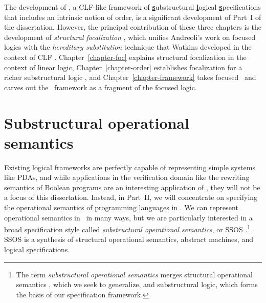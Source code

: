 The development of \sls, a CLF-like framework of \underline{\bf
  s}ubstructural \underline{\bf l}ogical \underline{\bf
  s}pecifications that includes an intrinsic notion of order, is a
significant development of Part~I of the dissertation.  However, the
principal contribution of these three chapters is the development of
{\it structural focalization} \cite{simmons11structural}, which
unifies Andreoli's work on focused logics \cite{andreoli92logic} with
the {\it hereditary substitution} technique that Watkins developed in
the context of CLF
\cite{watkins02concurrent}. Chapter~\ref{chapter-foc} explains
structural focalization in the context of linear logic,
Chapter~\ref{chapter-order} establishes focalization for a richer
substructural logic \ollll, and Chapter~\ref{chapter-framework} takes
focused \ollll~and carves out the \sls~framework as a fragment of the
focused logic.

\section{Substructural operational semantics}
\label{sec:intro-ssos}

Existing logical frameworks are perfectly capable of representing
simple systems like PDAs, and while applications in the verification
domain like the rewriting semantics of Boolean programs are an
interesting application of \sls, they will not be a focus of this
dissertation. Instead, in Part~II, we will concentrate on
specifying the operational semantics of programming languages in \sls.
%
We can represent operational semantics in
\sls~in many ways, but we are particularly interested in a broad
specification style called {\it substructural operational semantics},
or SSOS
\cite{pfenning04substructural,pfenning09substructural}.\footnote{The
  term {\it substructural operational semantics} merges structural
  operational semantics \cite{plotkin04structural}, which we seek to
  generalize, and substructural logic, which forms the basis of our
  specification framework.} SSOS is a synthesis of structural
operational semantics, abstract machines, and logical specifications.


